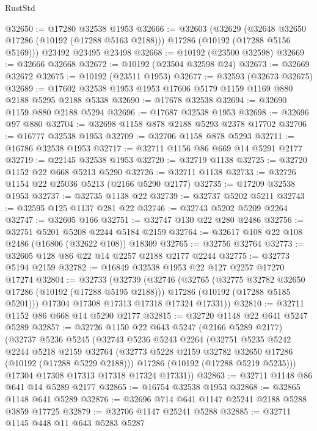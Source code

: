 \begin{lexlean}{RustStd}
\begin{coremodule}
@32650 := @17280 @32538 @1953
@32666 := @32603
    (@32629
      (@32648 @32650 @17286 (@10192 (@17288 @5163 @2188)))
      @17286
      (@10192 (@17288 @5156 @5169)))
    @23492
    @23495
    @23498
@32668 := @10192 (@23500 @32598)
@32669 := @32666 @32668
@32672 := @10192 (@23504 @32598 @24)
@32673 := @32669 @32672
@32675 := @10192 (@23511 @1953)
@32677 := @32593 (@32673 @32675)
@32689 := @17602 @32538 @1953 @1953 @17606 @5179 @1159 @1169 @880 @2188 @5295 @2188 @5338
@32690 := @17678 @32538
@32694 := @32690 @1159 @880 @2188 @5294
@32696 := @17687 @32538 @1953
@32698 := @32696 @97 @880
@32704 := @32698 @1158 @878 @2188 @5293 @2378 @17702
@32706 := @16777 @32538 @1953
@32709 := @32706 @1158 @878 @5293
@32711 := @16786 @32538 @1953
@32717 := @32711 @1156 @86 @669 @14 @5291 @2177
@32719 := @22145 @32538 @1953
@32720 := @32719 @1138
@32725 := @32720 @1152 @22 @668 @5213 @5290
@32726 := @32711 @1138
@32733 := @32726 @1154 @22 @25036 @5213 (@2166 @5290 @2177)
@32735 := @17209 @32538 @1953
@32737 := @32735 @1138 @22
@32739 := @32737 @5202 @5211
@32743 := @32595 @125 @1137 @281 @22
@32746 := @32743 @5202 @5209 @2264
@32747 := @32605 @166
@32751 := @32747 @130 @22 @280 @2486
@32756 := @32751 @5201 @5208 @2244 @5184 @2159
@32764 := @32617 @108 @22 @108 @2486 (@16806 (@32622 @108)) @18309
@32765 := @32756 @32764
@32773 := @32605 @128 @86 @22 @14 @2257 @2188 @2177 @2244
@32775 := @32773 @5194 @2159
@32782 := @16849 @32538 @1953 @22 @127 @2257 @17270 @17274
@32804 := @32733
    (@32739
      (@32746
        (@32765
          (@32775 @32782 @32650 @17286 (@10192 (@17288 @5195 @2188)))
          @17286
          (@10192 (@17288 @5185 @5201)))
        @17304
        @17308
        @17313
        @17318
        @17324
        @17331))
@32810 := @32711 @1152 @86 @668 @14 @5290 @2177
@32815 := @32720 @1148 @22 @641 @5247 @5289
@32857 := @32726
    @1150
    @22
    @643
    @5247
    (@2166 @5289 @2177)
    (@32737
      @5236
      @5245
      (@32743
        @5236
        @5243
        @2264
        (@32751
          @5235
          @5242
          @2244
          @5218
          @2159
          @32764
          (@32773 @5228 @2159 @32782 @32650 @17286 (@10192 (@17288 @5229 @2188)))
          @17286
          (@10192 (@17288 @5219 @5235)))
        @17304
        @17308
        @17313
        @17318
        @17324
        @17331))
@32863 := @32711 @1148 @86 @641 @14 @5289 @2177
@32865 := @16754 @32538 @1953
@32868 := @32865 @1148 @641 @5289
@32876 := @32696 @714 @641 @1147 @25241 @2188 @5288 @3859 @17725
@32879 := @32706 @1147 @25241 @5288
@32885 := @32711 @1145 @448 @11 @643 @5283 @5287

\end{coremodule}
\end{lexlean}
